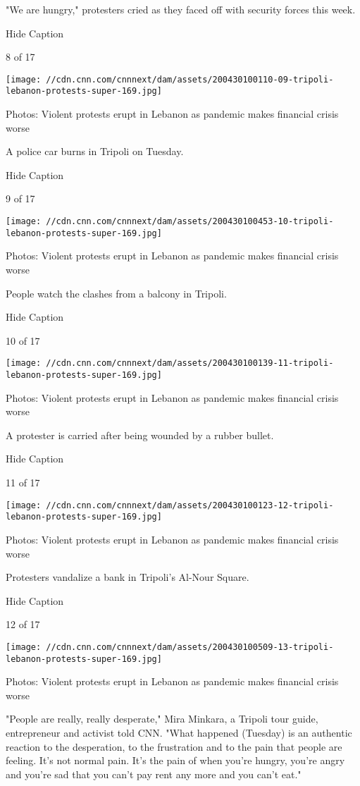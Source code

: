 "We are hungry," protesters cried as they faced off with security forces
this week.

Hide Caption

8 of 17

\texttt{[image: //cdn.cnn.com/cnnnext/dam/assets/200430100110-09-tripoli-lebanon-protests-super-169.jpg]}

Photos: Violent protests erupt in Lebanon as pandemic makes financial
crisis worse

A police car burns in Tripoli on Tuesday.

Hide Caption

9 of 17

\texttt{[image: //cdn.cnn.com/cnnnext/dam/assets/200430100453-10-tripoli-lebanon-protests-super-169.jpg]}

Photos: Violent protests erupt in Lebanon as pandemic makes financial
crisis worse

People watch the clashes from a balcony in Tripoli.

Hide Caption

10 of 17

\texttt{[image: //cdn.cnn.com/cnnnext/dam/assets/200430100139-11-tripoli-lebanon-protests-super-169.jpg]}

Photos: Violent protests erupt in Lebanon as pandemic makes financial
crisis worse

A protester is carried after being wounded by a rubber bullet.

Hide Caption

11 of 17

\texttt{[image: //cdn.cnn.com/cnnnext/dam/assets/200430100123-12-tripoli-lebanon-protests-super-169.jpg]}

Photos: Violent protests erupt in Lebanon as pandemic makes financial
crisis worse

Protesters vandalize a bank in Tripoli's Al-Nour Square.

Hide Caption

12 of 17

\texttt{[image: //cdn.cnn.com/cnnnext/dam/assets/200430100509-13-tripoli-lebanon-protests-super-169.jpg]}

Photos: Violent protests erupt in Lebanon as pandemic makes financial
crisis worse

"People are really, really desperate," Mira Minkara, a Tripoli tour
guide, entrepreneur and activist told CNN. "What happened (Tuesday) is
an authentic reaction to the desperation, to the frustration and to the
pain that people are feeling. It's not normal pain. It's the pain of
when you're hungry, you're angry and you're sad that you can't pay rent
any more and you can't eat."

